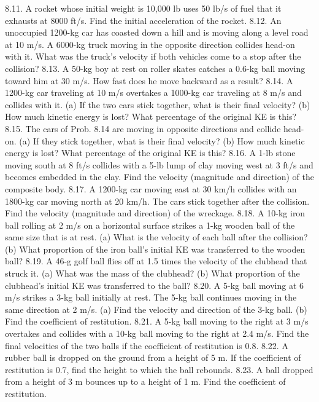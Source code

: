 8.11. A rocket whose initial weight is 10,000 lb uses 50 lb/s of fuel that it exhausts at 8000 ft/s. Find the initial acceleration
of the rocket.
8.12. An unoccupied 1200-kg car has coasted down a hill and is moving along a level road at 10 m/s. A 6000-kg truck
moving in the opposite direction collides head-on with it. What was the truck’s velocity if both vehicles come to a
stop after the collision?
8.13. A 50-kg boy at rest on roller skates catches a 0.6-kg ball moving toward him at 30 m/s. How fast does he move
backward as a result?
8.14. A 1200-kg car traveling at 10 m/s overtakes a 1000-kg car traveling at 8 m/s and collides with it. (a) If the two cars
stick together, what is their final velocity? (b) How much kinetic energy is lost? What percentage of the original KE
is this?
8.15. The cars of Prob. 8.14 are moving in opposite directions and collide head-on. (a) If they stick together, what is their
final velocity? (b) How much kinetic energy is lost? What percentage of the original KE is this?
8.16. A 1-lb stone moving south at 8 ft/s collides with a 5-lb lump of clay moving west at 3 ft/s and becomes embedded in
the clay. Find the velocity (magnitude and direction) of the composite body.
8.17. A 1200-kg car moving east at 30 km/h collides with an 1800-kg car moving north at 20 km/h. The cars stick together
after the collision. Find the velocity (magnitude and direction) of the wreckage.
8.18. A 10-kg iron ball rolling at 2 m/s on a horizontal surface strikes a 1-kg wooden ball of the same size that is at rest.
(a) What is the velocity of each ball after the collision? (b) What proportion of the iron ball’s initial KE was transferred
to the wooden ball?
8.19. A 46-g golf ball flies off at 1.5 times the velocity of the clubhead that struck it. (a) What was the mass of the clubhead?
(b) What proportion of the clubhead’s initial KE was transferred to the ball?
8.20. A 5-kg ball moving at 6 m/s strikes a 3-kg ball initially at rest. The 5-kg ball continues moving in the same direction
at 2 m/s. (a) Find the velocity and direction of the 3-kg ball. (b) Find the coefficient of restitution.
8.21. A 5-kg ball moving to the right at 3 m/s overtakes and collides with a 10-kg ball moving to the right at 2.4 m/s. Find
the final velocities of the two balls if the coefficient of restitution is 0.8.
8.22. A rubber ball is dropped on the ground from a height of 5 m. If the coefficient of restitution is 0.7, find the height to
which the ball rebounds.
8.23. A ball dropped from a height of 3 m bounces up to a height of 1 m. Find the coefficient of restitution.



